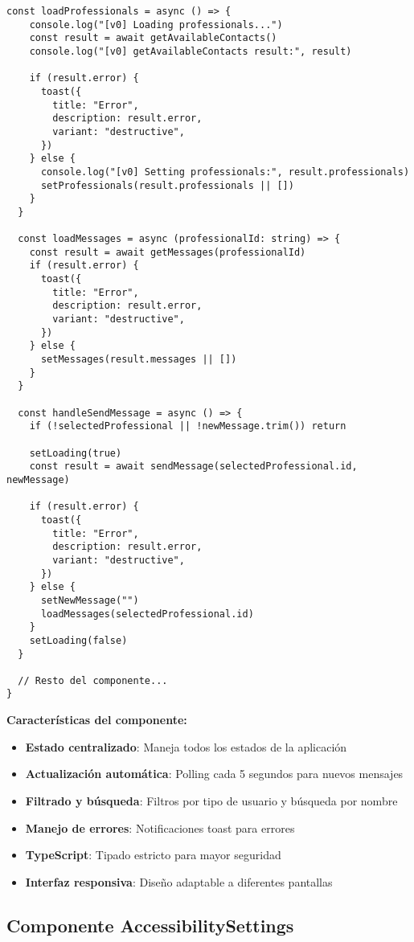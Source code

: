 \documentclass[12pt,a4paper]{article}
\begin{document}
\begin{lstlisting}[caption=components/messaging/messaging-interface.tsx - Estructura principal]
  const loadProfessionals = async () => {
    console.log("[v0] Loading professionals...")
    const result = await getAvailableContacts()
    console.log("[v0] getAvailableContacts result:", result)

    if (result.error) {
      toast({
        title: "Error",
        description: result.error,
        variant: "destructive",
      })
    } else {
      console.log("[v0] Setting professionals:", result.professionals)
      setProfessionals(result.professionals || [])
    }
  }

  const loadMessages = async (professionalId: string) => {
    const result = await getMessages(professionalId)
    if (result.error) {
      toast({
        title: "Error",
        description: result.error,
        variant: "destructive",
      })
    } else {
      setMessages(result.messages || [])
    }
  }

  const handleSendMessage = async () => {
    if (!selectedProfessional || !newMessage.trim()) return

    setLoading(true)
    const result = await sendMessage(selectedProfessional.id, newMessage)

    if (result.error) {
      toast({
        title: "Error",
        description: result.error,
        variant: "destructive",
      })
    } else {
      setNewMessage("")
      loadMessages(selectedProfessional.id)
    }
    setLoading(false)
  }

  // Resto del componente...
}
\end{lstlisting}

\textbf{Características del componente:}
\begin{itemize}
    \item \textbf{Estado centralizado}: Maneja todos los estados de la aplicación
    \item \textbf{Actualización automática}: Polling cada 5 segundos para nuevos mensajes
    \item \textbf{Filtrado y búsqueda}: Filtros por tipo de usuario y búsqueda por nombre
    \item \textbf{Manejo de errores}: Notificaciones toast para errores
    \item \textbf{TypeScript}: Tipado estricto para mayor seguridad
    \item \textbf{Interfaz responsiva}: Diseño adaptable a diferentes pantallas
\end{itemize}

\subsection{Componente AccessibilitySettings}
\end{document}
